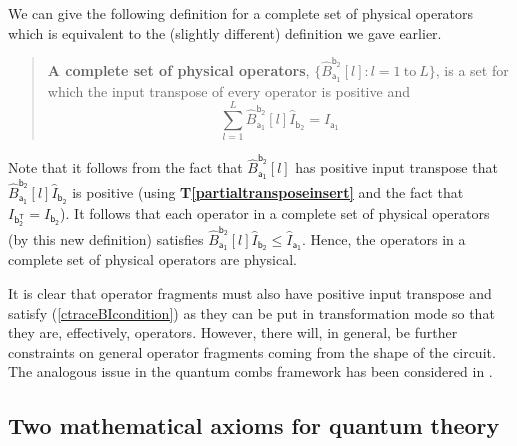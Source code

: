 \documentclass[10pt]{article}
\begin{document}
We can give the following definition for a complete set of physical operators which is equivalent to the (slightly different) definition we gave earlier.
\begin{quote}
{\bf A complete set of physical operators}, $\{ \hat B_\mathsf{a_1}^\mathsf{b_2}[l]: l=1~\text{to}~L\}$, is a set for which the input transpose of every operator is positive and
\begin{equation}\label{completepositiveI}
\sum_{l=1}^L \hat B_\mathsf{a_1}^\mathsf{b_2}[l]\hat I_\mathsf{b_2} = \hat I_\mathsf{a_1}
\end{equation}
\end{quote}
Note that it follows from the fact that $\hat B_\mathsf{a_1}^\mathsf{b_2}[l]$ has positive input transpose that $\hat B_\mathsf{a_1}^\mathsf{b_2}[l]\hat I_\mathsf{b_2}$ is positive (using {\bf T\ref{partialtransposeinsert}} and the fact that $I_\mathsf{b^T_2}=I_\mathsf{b_2}$).  It follows that each operator in a complete set of physical operators (by this new definition) satisfies $\hat B_\mathsf{a_1}^\mathsf{b_2}[l]\hat I_\mathsf{b_2} \leq \hat I_\mathsf{a_1}$.  Hence, the operators in a complete set of physical operators are physical.









It is clear that operator fragments must also have positive input transpose and satisfy (\ref{ctraceBIcondition}) as they can be put in transformation mode so that they are, effectively, operators.   However, there will, in general, be further constraints on general operator fragments coming from the shape of the circuit.  The analogous issue in the quantum combs framework has been considered in \cite{chiribella2009theoretical}.



\subsection{Two mathematical axioms for quantum theory}\label{QTaxioms}
\end{document}
